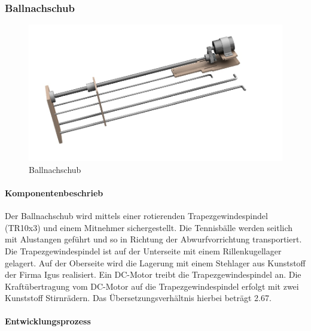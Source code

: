 \subsubsection{Ballnachschub}
\begin{figure}[h!]
	\centering
	\includegraphics[width=\linewidth]{../../fig/Ballnachschub}
	\caption{Ballnachschub}
	\label{fig:Ballnachschub}
\end{figure}
\paragraph{Komponentenbeschrieb}

Der Ballnachschub wird mittels einer rotierenden Trapezgewindespindel (TR10x3) und einem Mitnehmer sichergestellt. Die Tennisbälle werden seitlich mit Alustangen geführt und so in Richtung der Abwurfvorrichtung transportiert. Die Trapezgewindespindel ist auf der Unterseite mit einem Rillenkugellager gelagert. Auf der Oberseite wird die Lagerung mit einem Stehlager aus Kunststoff der Firma Igus realisiert. Ein DC-Motor treibt die Trapezgewindespindel an. Die Kraftübertragung vom DC-Motor auf die Trapezgewindespindel erfolgt mit zwei Kunststoff Stirnrädern. Das Übersetzungsverhältnis hierbei beträgt 2.67. 

\paragraph{Entwicklungsprozess}


